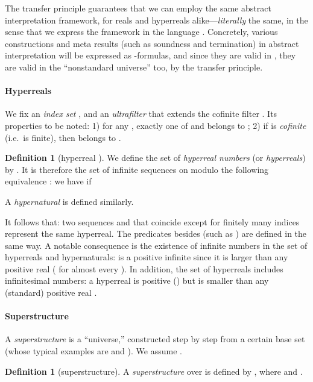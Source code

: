 \documentclass[envcountsect,orivec]{llncs} \pdfoutput=1
\theoremstyle{definition}
\newtheorem{mydef}[mythm]{Definition}
\begin{document}
The transfer principle guarantees that we can employ the same abstract
 interpretation
framework, for reals and hyperreals alike---\emph{literally} the same, in the sense that we express the framework
 in the
 language . Concretely, various
constructions
and meta results (such as soundness and termination) in abstract
interpretation will be expressed as -formulas, and since they are valid
 in , they are valid in the ``nonstandard universe''
  too, by the transfer principle. 











\paragraph{Hyperreals}
We fix an \emph{index set} , and an \emph{ultrafilter}  that extends
 the cofinite filter . Its properties to be noted: 1)
 for any , exactly one of  and 
 belongs to ; 2) if  is \emph{cofinite} (i.e.\  is finite), then  belongs to .


\begin{mydef}[hyperreal
 ]\label{definition:hypernumber}
We define the set
  of \emph{hyperreal numbers} (or \emph{hyperreals})
by
 . It is therefore the set of infinite sequences on  modulo the
 following equivalence : we have
  if
 
A \emph{hypernatural}  is defined similarly.
 \end{mydef}
\noindent
It follows that:
two sequences  and  that
coincide except for finitely many indices  represent the
same hyperreal.  The predicates besides   (such as ) are defined in the same
way.
A notable consequence is the existence of infinite numbers in the set of hyperreals and hypernaturals:
 is a positive infinite since it is larger than any positive real  ( for almost every ).
In addition, the set of hyperreals includes infinitesimal numbers: a hyperreal
  is positive
 () but is smaller than any (standard) positive real
 .







\paragraph{Superstructure}


A \emph{superstructure} is a ``universe,'' constructed step by
step
 from
a certain base set  (whose typical examples are
 and ). We assume
 .
\begin{mydef}[superstructure]\label{definition:superstructure}
A \emph{superstructure}  over  is
 defined by , where
 and
.
\end{mydef}
\end{document}
